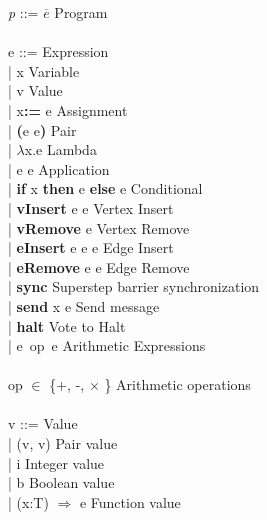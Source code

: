\begin{frame}
  \begin{tiny}
  \begin{roman-grammar}
    \textit{p} ::= $\overline{e}$  \>\>\>\>\> Program \\
\ \\
  e ::= \>\>\>\>\> Expression \\
  \ttab | x \>\>\>\>\> Variable \\
  \ttab | v  \>\>\>\>\> Value \\
  \ttab | x\textbf{:=} e \>\>\>\>\> Assignment \\
  \ttab | \textbf{(}e e\textbf{)} \>\>\>\>\> Pair \\
  \ttab | $\lambda$x.e \>\>\>\>\> Lambda \\
  \ttab | e e \>\>\>\>\> Application \\
  \ttab |  \textbf{if} x \textbf{then} e \textbf{else} e \>\>\>\>\> Conditional \\
  \ttab |  \textbf{vInsert} e e \>\>\>\>\> Vertex Insert \\
  \ttab |  \textbf{vRemove} e  \>\>\>\>\> Vertex Remove \\
  \ttab |  \textbf{eInsert} e e e  \>\>\>\>\> Edge Insert \\
  \ttab |  \textbf{eRemove} e e \>\>\>\>\> Edge Remove \\
  \ttab |  \textbf{sync} \>\>\>\>\> Superstep barrier synchronization\\
  \ttab |  \textbf{send} x e \>\>\>\>\> Send message\\
  \ttab |  \textbf{halt} \>\>\>\>\> Vote to Halt \\
  \ttab |  e\ op\ e \>\>\>\>\> Arithmetic Expressions \\  
\ \\
  op $\in$ \{+, -, $\times$ \} \>\>\>\>  Arithmetic operations \\
\ \\    
  v ::= \>\>  Value \\
    \ttab | (v, v) \>\>\>\>  Pair value \\
    \ttab | i \>\>\>\>  Integer value\\
    \ttab | b \>\>\>\>  Boolean value\\
    \ttab | (x:T) $\Rightarrow$ e \>\>\>\>  Function value\\
    

\end{roman-grammar}
\end{tiny}    
\end{frame}

